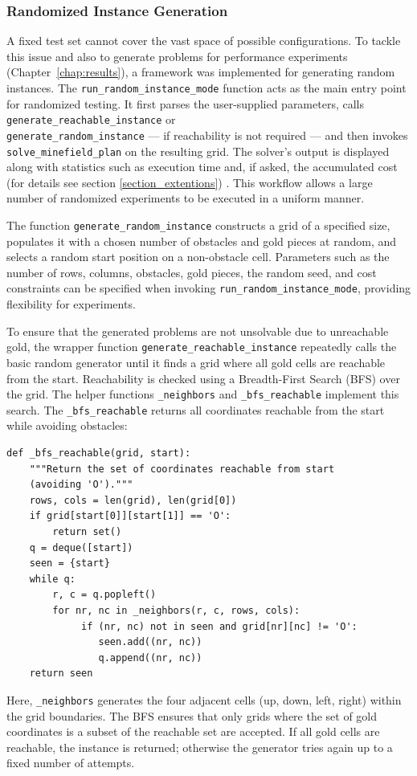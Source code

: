 \documentclass[12pt, a4paper, oneside]{report} %
\begin{document}
\subsubsection{Randomized Instance Generation}
A fixed test set cannot cover the vast space of possible configurations. To tackle this issue and also to generate problems for performance experiments (Chapter~\ref{chap:results}), a framework was implemented for generating random instances.
The \texttt{run\_random\_instance\_mode} function acts as the main entry point for randomized testing. It first parses the user-supplied parameters, calls \texttt{generate\_reachable\_instance} or \\ \texttt{generate\_random\_instance} --- if reachability is not required --- and then invokes \\ \texttt{solve\_minefield\_plan} on the resulting grid. The solver’s output is displayed along with statistics such as execution time and, if asked, the accumulated cost (for details see section \ref{section_extentions}) . This workflow allows a large number of randomized experiments to be executed in a uniform manner.

The function \texttt{generate\_random\_instance} constructs a grid of a specified size, populates it with a chosen number of obstacles and gold pieces at random, and selects a random start position on a non-obstacle cell. Parameters such as the number of rows, columns, obstacles, gold pieces, the random seed, and cost constraints can be specified when invoking \texttt{run\_random\_instance\_mode}, providing flexibility for experiments.

To ensure that the generated problems are not unsolvable due to 
unreachable gold, the wrapper function \texttt{generate\_reachable\_instance} repeatedly calls the basic random generator until it finds a grid where all gold cells are reachable from the start. Reachability is checked using a Breadth-First Search (BFS) over the grid. The helper functions \texttt{\_neighbors} and \texttt{\_bfs\_reachable} implement this search. The \texttt{\_bfs\_reachable} returns all coordinates reachable from the start while avoiding obstacles:
\begin{verbatim}
def _bfs_reachable(grid, start):
    """Return the set of coordinates reachable from start 
    (avoiding 'O')."""
    rows, cols = len(grid), len(grid[0])
    if grid[start[0]][start[1]] == 'O':
        return set()
    q = deque([start])
    seen = {start}
    while q:
        r, c = q.popleft()
        for nr, nc in _neighbors(r, c, rows, cols):
             if (nr, nc) not in seen and grid[nr][nc] != 'O':
                seen.add((nr, nc))
                q.append((nr, nc))
    return seen
\end{verbatim}
Here, \texttt{\_neighbors} generates the four adjacent cells (up, down, left, right) within the grid boundaries. The BFS ensures that only grids where the set of gold coordinates is a subset of the reachable set are accepted. If all gold cells are reachable, the instance is returned; otherwise the generator tries again up to a fixed number of attempts.
\end{document}
